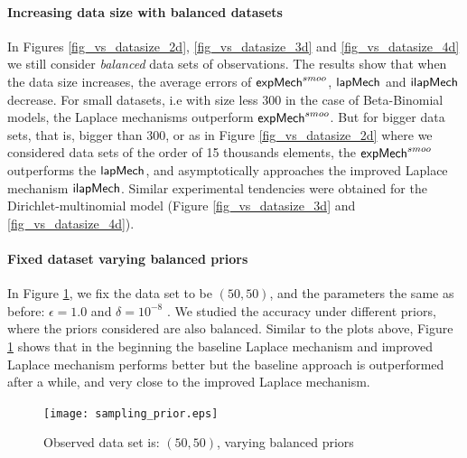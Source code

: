 \documentclass{article}
\begin{document}
\paragraph{Increasing data size with balanced datasets}
\label{subsubsec_vs_datasize}


\begin{figure}[ht]
\begin{center}
\centering
{}

\end{center}
\end{figure}

In Figures \ref{fig_vs_datasize_2d}, \ref{fig_vs_datasize_3d} and \ref{fig_vs_datasize_4d} we still consider \emph{balanced} data sets
of observations. The results show that when the data size increases, the average errors of
$\mathsf{expMech}^{smoo}$, $\mathsf{lapMech}$ and $\mathsf{ilapMech}$ decrease. For small datasets,
i.e with size less $300$ in the case of Beta-Binomial models, the Laplace mechanisms outperform $\mathsf{expMech}^{smoo}$.
But for bigger data sets, that is, bigger than $300$, or as in Figure \ref{fig_vs_datasize_2d} where
we considered data sets of the order of 15 thousands elements,
the $\mathsf{expMech}^{smoo}$ outperforms the $\mathsf{lapMech}$, and asymptotically approaches the improved Laplace mechanism $\mathsf{ilapMech}$.
Similar experimental tendencies were obtained for the Dirichlet-multinomial model (Figure \ref{fig_vs_datasize_3d} and \ref{fig_vs_datasize_4d}).


\paragraph{Fixed dataset varying balanced priors}
\label{subsubsec_vs_prior}
In Figure \ref{fig_vs_prior}, we fix the data set to be $(50,50)$, and the parameters the same as before: $\epsilon = 1.0$ and $\delta = 10^{-8}$ . We studied the accuracy under different priors, where the priors considered  are also balanced.
Similar to the plots above, Figure \ref{fig_vs_prior} shows that in the beginning the baseline Laplace mechanism and improved Laplace mechanism performs better but the baseline approach is outperformed after a while, and very close to the improved Laplace mechanism.
\begin{figure}
\centering
\texttt{[image: sampling\_prior.eps]}
\caption{Observed data set is: $(50,50)$, varying balanced priors}
\label{fig_vs_prior}
\end{figure}
\end{document}
